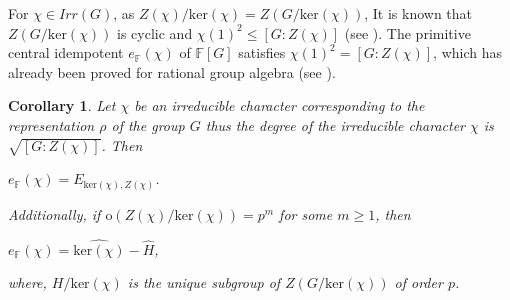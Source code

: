 \documentclass[12pt, reqno]{amsart}
\numberwithin{equation}{section}
\theoremstyle{definition}
\theoremstyle{remark}
\theoremstyle{plain}
\newtheorem{corollary}[definition]{Corollary}
\begin{document}
For $\chi\in Irr(G)$, as $Z(\chi)/\text{ker}(\chi)=Z(G/\text{ker}(\chi))$, It is known that $Z(G/\text{ker}(\chi))$ is cyclic and $\chi(1)^2\leq[G:Z(\chi)]$ (see \cite[Corollary 2.30]{Isaacs}). The primitive central idempotent $e_\mathbb{F}(\chi)$ of $\mathbb{F}[G]$ satisfies $\chi(1)^2=[G:Z(\chi)]$, which has already been proved for rational group algebra (see \cite{Bakshi}).
\begin{corollary}\label{C:irreducible}
  Let $\chi$ be an irreducible character corresponding to the representation $\rho$ of the group $G$ thus the degree of the irreducible character $\chi$ is $\sqrt{[G:Z(\chi)]}$. Then
  \begin{center}
    $e_{\mathbb{F}}(\chi)=E_{\text{ker}(\chi),Z(\chi)}$.
  \end{center}\smallskip
  
  Additionally, if $\text{o}(Z(\chi)/\text{ker}(\chi))=p^m$ for some $m\geq1$, then
  \begin{center}
    $e_{\mathbb{F}}(\chi)=\widehat{\text{ker}(\chi)}-\widehat{H}$, 
  \end{center}
where, $H/\text{ker}(\chi)$ is the unique subgroup of $Z(G/\text{ker}(\chi))$ of order $p$.  
\end{corollary}
\end{document}
